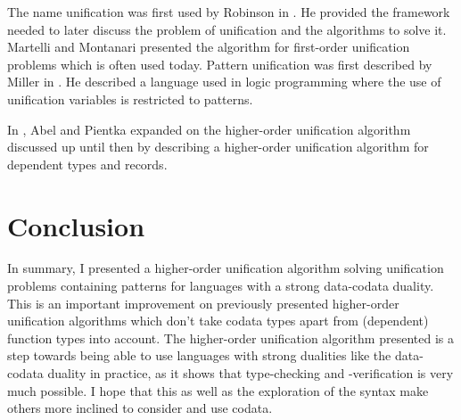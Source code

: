 \documentclass[twoside,12pt,a4paper]{article}
\begin{document}
The name unification was first used by Robinson in \cite{10.1145/321250.321253}. 
He provided the framework needed to later discuss the problem of unification and the algorithms to solve it.
Martelli and Montanari \cite{10.1145/357162.357169} presented the algorithm for first-order unification problems
which is often used today. 
Pattern unification was first described by Miller in \cite{10.1093/logcom/1.4.497}.
He described a language used in logic programming where the use of unification variables is restricted to patterns.

In \cite{10.5555/2021953.2021960}, Abel and Pientka expanded on the higher-order unification algorithm discussed up until then 
by describing a higher-order unification algorithm for dependent types and records.





\section{Conclusion}\label{sec:conclusion}
In summary, I presented a higher-order unification algorithm solving unification problems containing patterns 
for languages with a strong data-codata duality.
This is an important improvement on previously presented higher-order unification algorithms
which don't take codata types apart from (dependent) function types into account. 
The higher-order unification algorithm presented is a step towards 
being able to use languages with strong dualities like the data-codata duality in practice,
as it shows that type-checking and -verification is very much possible.
I hope that this as well as the exploration of the syntax make others more inclined to consider and use codata.





\end{document}
